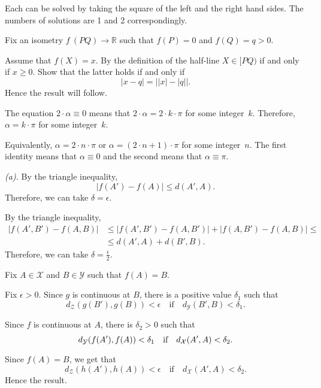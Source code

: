 Each can be solved by taking the square of the left and the right hand sides.
The numbers of solutions are 1 and 2 correspondingly.

Fix an isometry $f\:(P Q)\to \mathbb{R}$ such that $f(P)=0$ and $f(Q)=q>0$.

Assume that $f(X)=x$.
By the definition of the half-line $X\in[PQ)$ if and only if $x\ge 0$.
Show that the latter holds if and only if 
\[|x-q|=\bigl||x|-|q|\bigr|.\]
Hence the result will follow.

The equation
$2\cdot\alpha\equiv 0$
means that $2\cdot\alpha=2\cdot k\cdot\pi$ for some integer~$k$.
Therefore,
$\alpha=k\cdot\pi$ for some integer~$k$.

Equivalently, $\alpha=2\cdot n\cdot \pi$ or $\alpha=(2\cdot n+1)\cdot \pi$ for some integer~$n$.
The first identity means that $\alpha\equiv 0$ and the second means that $\alpha\equiv \pi$.

 \textit{(a).}
By the triangle inequality,
$$|f(A')-f(A)|\le d(A',A).$$
Therefore, we can take $\delta=\epsilon$.

By the triangle inequality,
\begin{align*}
|f(A',B')-f(A,B)|
&\le |f(A',B')-f(A,B')|
+|f(A,B')-f(A,B)|
\le
\\
&\le d(A',A)+d(B',B).
\end{align*}
Therefore, we can take $\delta=\tfrac\epsilon2$.

Fix $A\in \mathcal{X}$ and $B\in\mathcal{Y}$
such that $f(A)=B$.

Fix $\epsilon>0$.
Since $g$ is continuous at $B$, there is a positive value $\delta_1$ such that 
$$d_{\mathcal{Z}}(g(B'),g(B))<\epsilon
\quad
\text{if}
\quad
d_{\mathcal{Y}}(B',B)<\delta_1.$$ 

Since $f$ is continuous at $A$, there is $\delta_2>0$ such that 
$$d_{\mathcal{Y}}(f(A'),f(A))\z<\delta_1
\quad
\text{if}
\quad
d_{\mathcal{X}}(A',A)<\delta_2.$$ 

Since $f(A)=B$, we get that
$$d_{\mathcal{Z}}(h(A'),h(A))<\epsilon
\quad
\text{if}
\quad
d_{\mathcal{X}}(A',A)<\delta_2.$$ 
Hence the result.

\setcounter{eqtn}{0}

